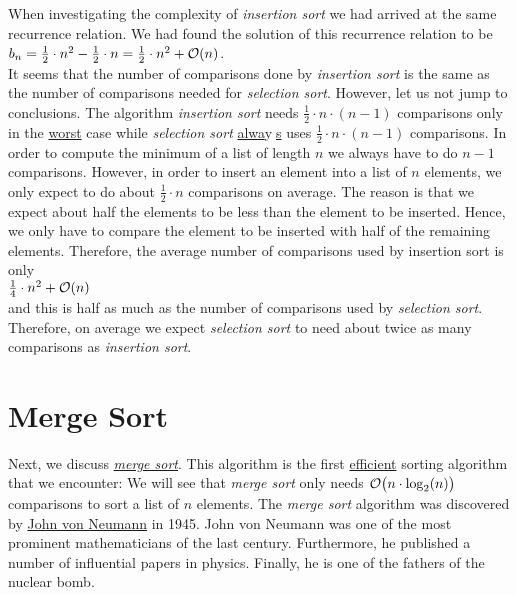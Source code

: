 When investigating the complexity of \emph{insertion sort} we had arrived at the same recurrence
relation. We had found the solution of this recurrence relation to be
\\[0.2cm]
\hspace*{1.3cm} $b_n = \frac{1}{2} \cdot n^2 - \frac{1}{2}\cdot n = \frac{1}{2} \cdot n^2 +
\mathcal{O}(n)$. 
\\[0.2cm]
It seems that the number of comparisons done by \emph{insertion sort} is the same as the number of
comparisons needed for \emph{selection sort}.  However, let us not jump to conclusions.
The algorithm \emph{insertion sort} needs
$\frac{1}{2}\cdot n \cdot (n-1)$ comparisons only in the \underline{worst} case while \emph{selection sort}
\underline{alwa}y$\!\!$\underline{$\;$s} uses $\frac{1}{2} \cdot n\cdot(n-1)$ comparisons.
In order to compute the minimum of a list of length $n$ we always have to do $n-1$ comparisons.
However, in order to insert an element into a list of $n$ elements, we only expect to do about
$\frac{1}{2} \cdot n$ comparisons on average.  The reason is that we expect about half the elements  to
be less than the element to be inserted.  Hence, we only have to compare the element to be inserted
with half of the remaining elements.  Therefore, the average number of comparisons used by
insertion sort is only
\\[0.2cm]
\hspace*{1.3cm}
 $\frac{1}{4} \cdot n^2 + \mathcal{O}(n)$
\\[0.2cm]
and this is half as much as the number of comparisons used by \emph{selection sort}.  Therefore, on
average we expect \emph{selection sort} to need about twice as many comparisons as \emph{insertion sort}.



\section{Merge Sort}
Next, we discuss \href{http://en.wikipedia.org/wiki/Merge_sort}{\emph{merge sort}}.  This algorithm
is the first \underline{efficient} sorting algorithm that we encounter: We will see that \emph{merge sort} 
only needs $\mathcal{O}\bigl(n \cdot \log_2(n)\bigr)$ comparisons to sort a list of $n$ elements.  
The \emph{merge sort} algorithm was discovered by
\href{http://en.wikipedia.org/wiki/John_von_Neumann}{John von Neumann} in 1945.  John von Neumann 
was one of the most prominent mathematicians of the last century.  Furthermore, he published a
number of influential papers in physics.  Finally, he is one of the fathers of the nuclear bomb.


